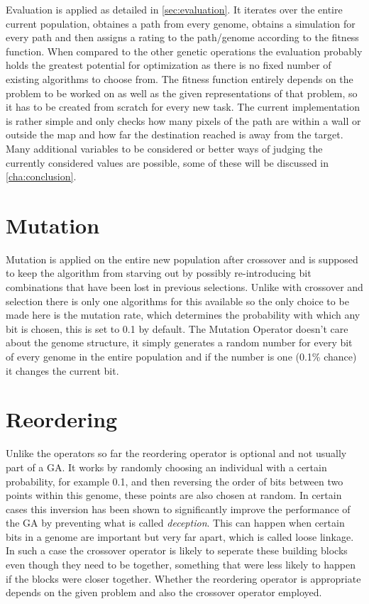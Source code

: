 Evaluation is applied as detailed in \ref{sec:evaluation}. It iterates over the entire current population, obtaines a path from every genome, obtains a simulation for every path and then assigns a rating to the path/genome according to the fitness function. 
When compared to the other genetic operations the evaluation probably holds the greatest potential for optimization as there is no fixed number of existing algorithms to choose from. The fitness function entirely depends on the problem to be worked on as well as the given representations of that problem, so it has to be created from scratch for every new task. The current implementation is rather simple and only checks how many pixels of the path are within a wall or outside the map and how far the destination reached is away from the target. Many additional variables to be considered or better ways of judging the currently considered values are possible, some of these will be discussed in \ref{cha:conclusion}.

\section{Mutation} %
\label{sec:mutation}

Mutation is applied on the entire new population after crossover and is supposed to keep the algorithm from starving out by possibly re-introducing bit combinations that have been lost in previous selections. Unlike with crossover and selection there is only one algorithms for this available so the only choice to be made here is the mutation rate, which determines the probability with which any bit is chosen, this is set to 0.1 by default. The Mutation Operator doesn't care about the genome structure, it simply generates a random number for every bit of every genome in the entire population and if the number is one (0.1\% chance) it changes the current bit.

\section{Reordering}
\label{sec:reordering}

Unlike the operators so far the reordering operator is optional and not usually part of a GA. It works by randomly choosing an individual with a certain probability, for example 0.1, and then reversing the order of bits between two points within this genome, these points are also chosen at random. In certain cases this inversion has been shown to significantly improve the performance of the GA by preventing what is called \textit{deception}\cite{8}. This can happen when certain bits in a genome are important but very far apart, which is called loose linkage. In such a case the crossover operator is likely to seperate these building blocks even though they need to be together, something that were less likely to happen if the blocks were closer together. Whether the reordering operator is appropriate depends on the given problem and also the crossover operator employed. \cite{8} %
